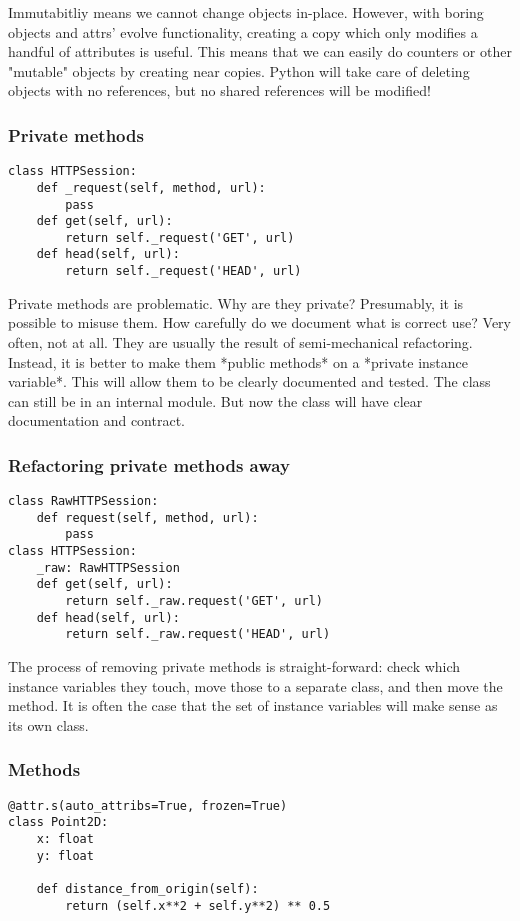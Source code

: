 \documentclass[ignorenonframetext,aspectration=169]{beamer}
\begin{document}
Immutabitliy means we cannot change objects in-place.
However,
with boring objects
and attrs' evolve functionality,
creating a copy which only modifies a handful of attributes is useful.
This means that we can easily do counters or other
"mutable" objects
by creating near copies.
Python will take care of deleting objects with no references,
but no shared references will be modified!

\begin{frame}[fragile]
\frametitle{Private methods}

\begin{lstlisting}
class HTTPSession:
    def _request(self, method, url):
        pass
    def get(self, url):
        return self._request('GET', url)
    def head(self, url):
        return self._request('HEAD', url)
\end{lstlisting}
    
\end{frame}

Private methods are problematic.
Why are they private?
Presumably,
it is possible to misuse them.
How carefully do we document what is correct use?
Very often,
not at all.
They are usually the result of semi-mechanical refactoring.
Instead,
it is better to make them
*public methods*
on a
*private instance variable*.
This will allow them to be clearly documented and tested.
The class can still be in an internal module.
But now the class will have clear documentation
and contract.

\begin{frame}[fragile]
\frametitle{Refactoring private methods away}

\begin{lstlisting}
class RawHTTPSession:
    def request(self, method, url):
        pass
class HTTPSession:
    _raw: RawHTTPSession
    def get(self, url):
        return self._raw.request('GET', url)
    def head(self, url):
        return self._raw.request('HEAD', url)
\end{lstlisting}
    
\end{frame}

The process of removing private methods is straight-forward:
check which instance variables they touch,
move those to a separate class,
and then move the method.
It is often the case that the set of instance variables
will
make sense as its own class.

\begin{frame}[fragile]
\frametitle{Methods}

\begin{lstlisting}
@attr.s(auto_attribs=True, frozen=True)
class Point2D:
    x: float
    y: float

    def distance_from_origin(self):
        return (self.x**2 + self.y**2) ** 0.5
\end{lstlisting}

\end{frame}
\end{document}
